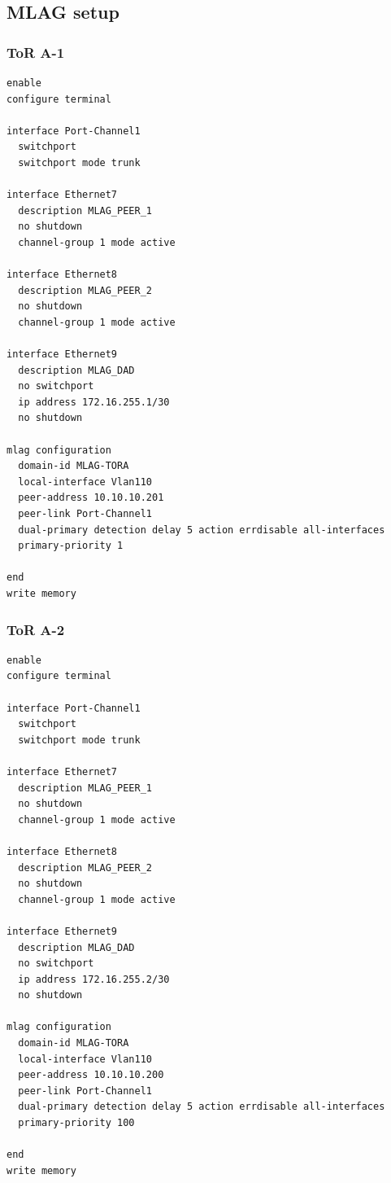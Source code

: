 \subsection{MLAG setup}

\subsubsection{ToR A-1}
\begin{lstlisting}[caption={ToR A-1: MLAG peer-link and domain configuration.},basicstyle=\ttfamily\footnotesize,breaklines=true]
enable
configure terminal

interface Port-Channel1
  switchport
  switchport mode trunk

interface Ethernet7
  description MLAG_PEER_1
  no shutdown
  channel-group 1 mode active

interface Ethernet8
  description MLAG_PEER_2
  no shutdown
  channel-group 1 mode active

interface Ethernet9
  description MLAG_DAD
  no switchport
  ip address 172.16.255.1/30
  no shutdown

mlag configuration
  domain-id MLAG-TORA
  local-interface Vlan110
  peer-address 10.10.10.201
  peer-link Port-Channel1
  dual-primary detection delay 5 action errdisable all-interfaces
  primary-priority 1

end
write memory
\end{lstlisting}

\subsubsection{ToR A-2}
\begin{lstlisting}[caption={ToR A-2: MLAG peer-link and domain configuration.},basicstyle=\ttfamily\footnotesize,breaklines=true]
enable
configure terminal

interface Port-Channel1
  switchport
  switchport mode trunk

interface Ethernet7
  description MLAG_PEER_1
  no shutdown
  channel-group 1 mode active

interface Ethernet8
  description MLAG_PEER_2
  no shutdown
  channel-group 1 mode active

interface Ethernet9
  description MLAG_DAD
  no switchport
  ip address 172.16.255.2/30
  no shutdown

mlag configuration
  domain-id MLAG-TORA
  local-interface Vlan110
  peer-address 10.10.10.200
  peer-link Port-Channel1
  dual-primary detection delay 5 action errdisable all-interfaces
  primary-priority 100

end
write memory
\end{lstlisting}

